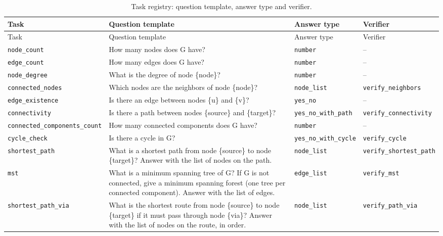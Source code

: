 {\small
\begin{longtable}{>{\raggedright\arraybackslash}p{3.4cm} >{\raggedright\arraybackslash}p{5.4cm} >{\raggedright\arraybackslash}p{2.2cm} >{\raggedright\arraybackslash}p{3.2cm}}
  \caption{Task registry: question template, answer type and verifier.}\label{tab:templates}\\
  \toprule
  Task & Question template & Answer type & Verifier \\
  \midrule
  \endfirsthead
  \toprule
  Task & Question template & Answer type & Verifier \\
  \midrule
  \endhead
  \bottomrule
  \endfoot
    \texttt{node\_count} & How many nodes does G have? & \texttt{number} & -- \\
    \texttt{edge\_count} & How many edges does G have? & \texttt{number} & -- \\
    \texttt{node\_degree} & What is the degree of node \{node\}? & \texttt{number} & -- \\
    \texttt{connected\_nodes} & Which nodes are the neighbors of node \{node\}? & \texttt{node\_list} & \texttt{verify\_neighbors} \\
    \texttt{edge\_existence} & Is there an edge between nodes \{u\} and \{v\}? & \texttt{yes\_no} & -- \\
    \texttt{connectivity} & Is there a path between nodes \{source\} and \{target\}? & \texttt{yes\_no\_with\_path} & \texttt{verify\_connectivity} \\
    \texttt{connected\_components\_count} & How many connected components does G have? & \texttt{number} & -- \\
    \texttt{cycle\_check} & Is there a cycle in G? & \texttt{yes\_no\_with\_cycle} & \texttt{verify\_cycle} \\
    \texttt{shortest\_path} & What is a shortest path from node \{source\} to node \{target\}? Answer with the list of nodes on the path. & \texttt{node\_list} & \texttt{verify\_shortest\_path} \\
    \texttt{mst} & What is a minimum spanning tree of G? If G is not connected, give a minimum spanning forest (one tree per connected component). Answer with the list of edges. & \texttt{edge\_list} & \texttt{verify\_mst} \\
    \texttt{shortest\_path\_via} & What is the shortest route from node \{source\} to node \{target\} if it must pass through node \{via\}? Answer with the list of nodes on the route, in order. & \texttt{node\_list} & \texttt{verify\_path\_via} \\

\end{longtable}}
